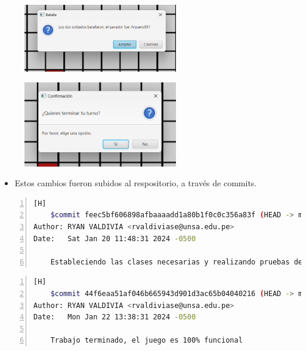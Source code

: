 \documentclass{article}
\begin{document}
	\begin{figure}[H]
		\centering
	\includegraphics[width=0.6\textwidth,keepaspectratio]{img/menu3.png}
	\end{figure}
	
	\begin{figure}[H]
		\centering
	\includegraphics[width=0.6\textwidth,keepaspectratio]{img/menu4.png}
	\end{figure}
	\begin{itemize}	
		\item Estos cambios fueron subidos al respositorio, a través de commits.
	\end{itemize}
	
	\begin{lstlisting}[language=bash,caption={Commit}, numbers=left][H]
	$commit feec5bf606898afbaaaadd1a80b1f0c0c356a83f (HEAD -> main, origin/main)
Author: RYAN VALDIVIA <rvaldiviase@unsa.edu.pe>
Date:   Sat Jan 20 11:48:31 2024 -0500

    Estableciendo las clases necesarias y realizando pruebas de JavaFx, usando IntelliJ Idea
	\end{lstlisting}
	
	\begin{lstlisting}[language=bash,caption={Commit}, numbers=left][H]
	$commit 44f6eaa51af046b665943d901d3ac65b04040216 (HEAD -> main, origin/main)
Author: RYAN VALDIVIA <rvaldiviase@unsa.edu.pe>
Date:   Mon Jan 22 13:38:31 2024 -0500

    Trabajo terminado, el juego es 100% funcional
	\end{lstlisting}
	
\end{document}
